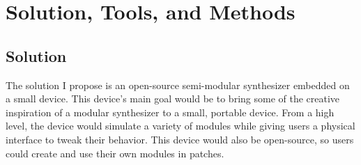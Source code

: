 \section{Solution, Tools, and Methods}
    \subsection{Solution}
    
        
        The solution I propose is an open-source semi-modular synthesizer embedded on a small device.
        This device's main goal would be to bring some of the creative inspiration of a modular synthesizer to a small, portable device.
        From a high level, the device would simulate a variety of modules while giving users a physical interface to tweak their behavior.
        This device would also be open-source, so users could create and use their own modules in patches.
        
